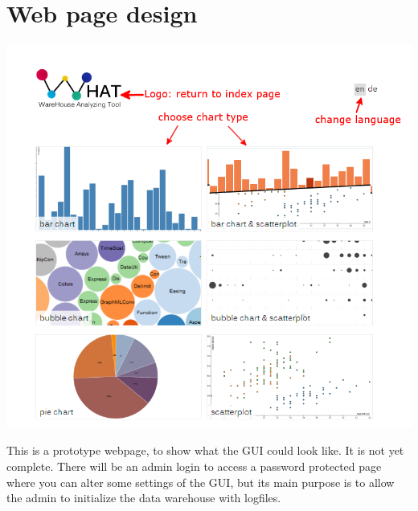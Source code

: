 \section{Web page design}


\begin{center}
\includegraphics[width=0.9\linewidth]{Pictures/WHATHome.png}
\end{center}   

This is a prototype webpage, to show what the GUI could look like. It is not yet complete.
There will be an admin login to access a password protected page where you can alter
some settings of the GUI, but its main purpose is to allow the admin to initialize the data warehouse
with logfiles. %
